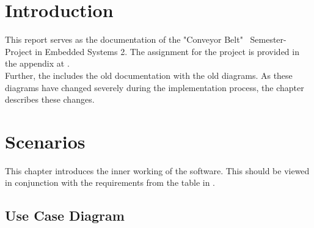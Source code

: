 \documentclass[a4paper,12pt,twoside]{scrreprt}
\begin{document}

\chapter{Introduction}
\label{chap:Introduction}
This report serves as the documentation of the "Conveyor Belt" \, Semester-Project in Embedded Systems 2. The assignment for the project is provided in the appendix at . \\
Further, the  includes the old documentation with the old diagrams. As these diagrams have changed severely during the implementation process, the chapter  describes these changes. 

\chapter{Scenarios}
This chapter introduces the inner working of the software. This should be viewed in conjunction with the requirements from the table in . 

\section{Use Case Diagram}
\label{chap:Use_Case_Diagram}
\end{document}
